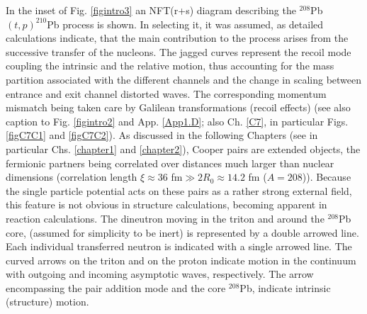 In the inset of Fig. \ref{figintro3} an NFT(r+s) diagram describing the $^{208}$Pb$(t,p)^{210}$Pb process is shown. In selecting it, it was  assumed, as detailed calculations indicate, that the main contribution to the process arises from the successive transfer of the nucleons. The jagged curves represent the recoil  mode coupling the intrinsic and the relative motion,  thus accounting for the mass partition associated with the different channels and the change in scaling between entrance and exit channel distorted waves. The corresponding momentum mismatch being taken care by Galilean transformations (recoil effects) (see also caption to Fig. \ref{figintro2} and App. \ref{App1.D}; also Ch. \ref{C7}, in particular Figs. \ref{figC7C1} and \ref{figC7C2}). As discussed in the following Chapters (see in particular Chs. \ref{chapter1} and \ref{chapter2}), Cooper pairs are extended objects, the fermionic partners being correlated over distances much larger than nuclear dimensions (correlation length $\xi\approx36$ fm$\gg 2R_0\approx 14.2$ fm ($A=208$)). Because the single particle potential acts on these pairs as a rather strong external field, this feature is not obvious in structure calculations, becoming apparent in reaction calculations. The dineutron moving in the triton and around the $^{208}$Pb core, (assumed for simplicity to be inert) is represented by a double arrowed line. Each individual transferred neutron is indicated with a single arrowed line. The curved arrows on the triton and on the proton indicate motion in the continuum with outgoing and incoming asymptotic waves, respectively. The arrow encompassing the pair addition mode and the core $^{208}$Pb, indicate intrinsic (structure) motion. 


